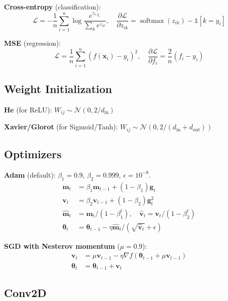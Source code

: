 \documentclass[11pt,a4paper]{article}
\theoremstyle{definition}
\theoremstyle{remark}
\DeclareMathOperator{\softmax}{softmax}
\begin{document}
\textbf{Cross-entropy} (classification):
\begin{equation}
\mathcal{L} = -\frac{1}{n}\sum_{i=1}^n \log\frac{e^{z_{i,y_i}}}{\sum_k e^{z_{ik}}}, \quad \frac{\partial\mathcal{L}}{\partial z_{ik}} = \softmax(z_{ik}) - \mathbb{1}[k = y_i]
\end{equation}

\textbf{MSE} (regression):
\begin{equation}
\mathcal{L} = \frac{1}{n}\sum_{i=1}^n(f(\mathbf{x}_i) - y_i)^2, \quad \frac{\partial\mathcal{L}}{\partial f_i} = \frac{2}{n}(f_i - y_i)
\end{equation}

\subsection{Weight Initialization}

\textbf{He} (for ReLU): $W_{ij} \sim \mathcal{N}(0, 2/d_{\mathrm{in}})$

\textbf{Xavier/Glorot} (for Sigmoid/Tanh): $W_{ij} \sim \mathcal{N}(0, 2/(d_{\mathrm{in}} + d_{\mathrm{out}}))$

\subsection{Optimizers}

\textbf{Adam} (default): $\beta_1 = 0.9$, $\beta_2 = 0.999$, $\epsilon = 10^{-8}$.
\begin{align}
\mathbf{m}_t &= \beta_1\mathbf{m}_{t-1} + (1-\beta_1)\mathbf{g}_t \\
\mathbf{v}_t &= \beta_2\mathbf{v}_{t-1} + (1-\beta_2)\mathbf{g}_t^2 \\
\hat{\mathbf{m}}_t &= \mathbf{m}_t/(1-\beta_1^t), \quad \hat{\mathbf{v}}_t = \mathbf{v}_t/(1-\beta_2^t) \\
\boldsymbol{\theta}_t &= \boldsymbol{\theta}_{t-1} - \eta\hat{\mathbf{m}}_t/(\sqrt{\hat{\mathbf{v}}_t} + \epsilon)
\end{align}

\textbf{SGD with Nesterov momentum} ($\mu = 0.9$):
\begin{align}
\mathbf{v}_t &= \mu\mathbf{v}_{t-1} - \eta\nabla f(\boldsymbol{\theta}_{t-1} + \mu\mathbf{v}_{t-1}) \\
\boldsymbol{\theta}_t &= \boldsymbol{\theta}_{t-1} + \mathbf{v}_t
\end{align}

\subsection{Conv2D}
\end{document}
